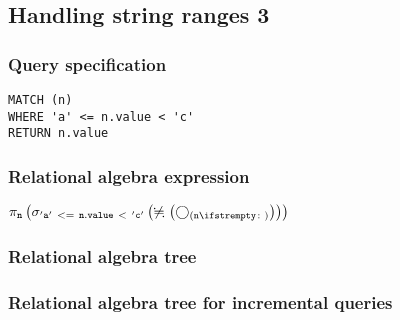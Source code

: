 \subsection{Handling string ranges 3}

\subsubsection*{Query specification}

\begin{lstlisting}
MATCH (n)
WHERE 'a' <= n.value < 'c'
RETURN n.value
\end{lstlisting}

\subsubsection*{Relational algebra expression}

$\projection{\var{n}} \left(\selection{\mathtt{'a'~<=~n.value~<~'c'}} \left(\alldifferent{} \left(\getvertices{n}{}\right)\right)\right)$

\subsubsection*{Relational algebra tree}


\subsubsection*{Relational algebra tree for incremental queries}


